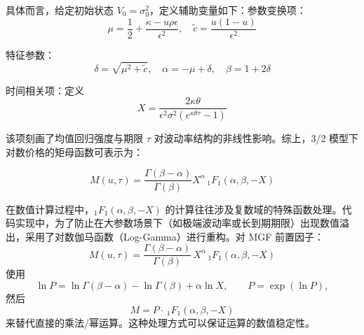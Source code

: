 具体而言，给定初始状态 $V_0 = \sigma_0^2$，定义辅助变量如下：参数变换项：$$\mu = \frac{1}{2} + \frac{\kappa - u \rho \epsilon}{\epsilon^2}, \quad \tilde{c} = \frac{u(1-u)}{\epsilon^2}$$

特征参数：$$\delta = \sqrt{\mu^2 + \tilde{c}}, \quad \alpha = -\mu + \delta, \quad \beta = 1 + 2\delta$$

时间相关项：定义 $$X = \frac{2\kappa \theta}{\epsilon^2 \sigma^2 (e^{\kappa \theta \tau} - 1)}$$

该项刻画了均值回归强度与期限 $\tau$ 对波动率结构的非线性影响。综上，3/2 模型下对数价格的矩母函数可表示为：

$$M(u, \tau) = \frac{\Gamma(\beta - \alpha)}{\Gamma(\beta)} X^\alpha \, _1F_1(\alpha, \beta, -X)$$

在数值计算过程中，$_1F_1(\alpha, \beta, -X)$ 的计算往往涉及复数域的特殊函数处理。代码实现中，为了防止在大参数场景下（如极端波动率或长到期期限）出现数值溢出，采用了对数伽马函数（Log-Gamma）进行重构。对 MGF 前置因子：
\[
M(u,\tau)=\frac{\Gamma(\beta-\alpha)}{\Gamma(\beta)}\,X^\alpha\,_1F_1(\alpha,\beta,-X)
\]
使用
\[
\ln P = \ln \Gamma(\beta-\alpha) - \ln \Gamma(\beta) + \alpha\ln X,
\qquad
P = \exp(\ln P),
\]
然后
\[
M = P \cdot\,_1F_1(\alpha,\beta,-X)
\]
来替代直接的乘法/幂运算。这种处理方式可以保证运算的数值稳定性。